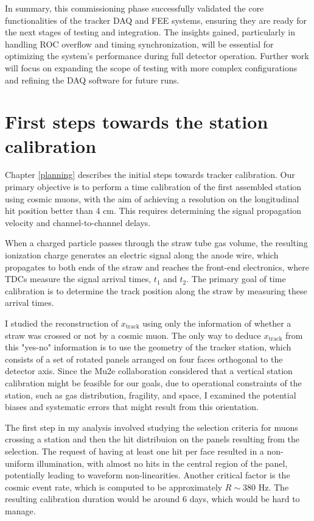 In summary, this commissioning phase successfully validated 
the core functionalities 
of the tracker DAQ and FEE systems, ensuring they are ready 
for the next stages of 
testing and integration. The insights gained, particularly 
in handling ROC overflow 
and timing synchronization, will be essential for optimizing 
the system's performance 
during full detector operation. Further work will focus on 
expanding the scope of 
testing with more complex configurations and refining the 
DAQ software for future runs.


\section{First steps towards the station calibration}
Chapter \ref{planning} describes the initial steps towards 
tracker calibration. Our primary objective is to perform a time calibration of 
the first assembled station using cosmic muons, with the aim of achieving 
a resolution on the longitudinal hit position better than 4 cm. This  
requires determining the signal propagation velocity and 
channel-to-channel delays. 

When a charged particle passes through the straw tube gas volume, the 
resulting ionization charge generates an electric signal along the anode wire, 
which propagates to both ends of the straw and reaches the front-end 
electronics, 
where TDCs measure the signal arrival times, $t_1$ and $t_2$. The primary 
goal of time calibration is to determine the track position along the straw 
by measuring these arrival times. 

I studied the reconstruction of $x_{\text{track}}$ using only the 
information of 
whether a straw was crossed or not by a cosmic muon. The only 
way to deduce $x_{\text{track}}$ 
from this "yes-no" information is to use the geometry of the tracker station, 
which consists of a set of rotated panels arranged on four faces orthogonal 
to the detector axis. Since the Mu2e collaboration considered 
that a vertical station calibration might be feasible for our 
goals, due to operational constraints of the station, such as 
gas distribution, fragility, and space, I examined the potential 
biases and systematic errors that might result from this orientation. 

The first step in my analysis involved studying the selection criteria for 
muons crossing a station and then the hit distribuion on the panels 
resulting from the selection. 
The request of having at least one hit per face resulted in 
a non-uniform illumination, with almost no hits 
in the central region of the panel, potentially leading to 
waveform non-linearities. 
Another critical factor is the cosmic event rate, which is 
computed to be approximately 
$R \sim 380$ Hz. The resulting calibration duration would be around 6 days, 
which would be hard to manage. 


